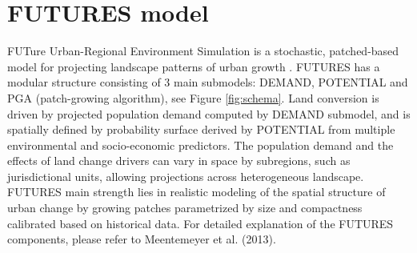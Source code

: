 \documentclass{isprs}
\begin{document}



%   





\section{FUTURES model}
FUTure Urban-Regional Environment Simulation
is a stochastic, patched-based model
for projecting landscape patterns of urban growth \cite{Meentemeyer2012}.
FUTURES has a modular structure consisting of 3 main submodels: DEMAND, POTENTIAL and
PGA (patch-growing algorithm), see Figure \ref{fig:schema}.
Land conversion is driven by projected population demand computed by DEMAND submodel,
and is spatially defined by probability surface derived by POTENTIAL
from multiple environmental and socio-economic predictors.
The population demand and the effects of land change drivers can vary in space by subregions,
such as jurisdictional units, allowing projections across heterogeneous landscape.
FUTURES main strength lies in realistic modeling of the 
spatial structure of urban change by growing
patches parametrized by size and compactness calibrated based on historical data.
For detailed explanation of the FUTURES components, please refer to Meentemeyer et al. (2013).
\end{document}
